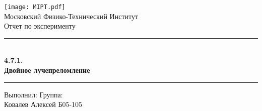 \documentclass[a4paper,12pt]{article}
\begin{document}
\begin{titlepage}
        \vspace*{\fill}

        \begin{center}
            \texttt{[image: MIPT.pdf]}
            \\[0.7cm]\Huge Московский Физико-Технический Институт
            \\[2cm]\LARGE Отчет по эксперименту
            \\[0.5cm]\noindent\rule{\textwidth}{1pt}
            \\\Huge\textbf{4.7.1. \\ Двойное лучепреломление}
            \\[-0.5cm]\noindent\rule{\textwidth}{1pt}
        \end{center}

        \vspace*{\fill}

        \begin{flushleft}
            Выполнил: \hspace{\fill} Группа:
            \\Ковалев Алексей \hspace{\fill} Б05-105
        \end{flushleft}
    \end{titlepage}

    \setcounter{page}{2}
\end{document}
